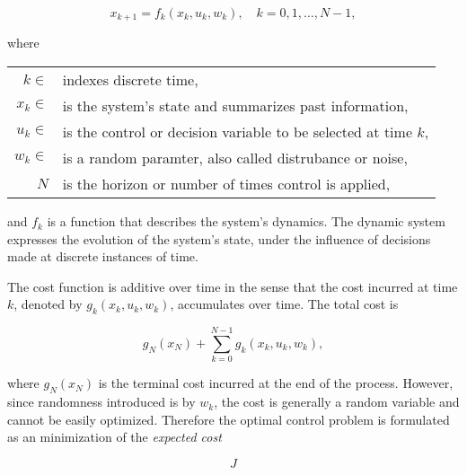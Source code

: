 \begin{equation*}
  x_{k+1} = f_k(x_k, u_k, w_k), \quad k = 0,1,\dots,N-1,
\end{equation*}

where

\begin{table}[h]
  \centering
  \begin{tabular}{rl}
    $k \in$ & indexes discrete time, \\
    $x_k \in$  & is the system's state and summarizes past information, \\
    $u_k \in$ & is the control or decision variable to be selected at time $k$, \\
    $w_k \in$ & is a random paramter, also called distrubance or noise, \\
    $N$ & is the horizon or number of times control is applied, 
  \end{tabular}
\end{table}

and $f_k$ is a function that describes the system's dynamics. The dynamic system expresses the evolution of the system's state, under the
influence of decisions made at discrete instances of time. 

The cost function is additive over time in the sense that the cost incurred at
time $k$, denoted by $g_k(x_k, u_k, w_k)$, accumulates over time. The total cost
is

\begin{equation*}
  g_N(x_N) + \sum\limits_{k=0}^{N-1}{g_k(x_k, u_k, w_k)},
\end{equation*}

where $g_N(x_N)$ is the terminal cost incurred at the end of the process.
However, since randomness introduced is by $w_k$, the cost is generally a
random variable and cannot be easily optimized. Therefore the optimal control
problem is formulated as an minimization of the \textit{expected cost}

\begin{equation*}
  J
\end{equation*}
